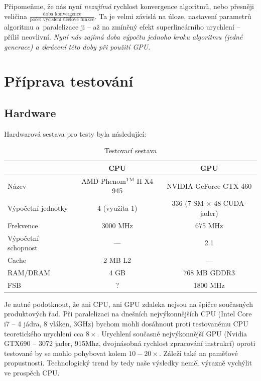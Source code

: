 
Připomeňme, že nás nyní \emph{nezajímá} rychlost konvergence algoritmů, nebo přesněji veličina $\frac{\text{doba konvergence}}{\text{počet vyčíslení účelové funkce}}$. Ta je velmi závislá na úloze, nastavení parametrů algoritmu a~paralelizace ji -- až na zmíněný efekt superlineárního urychlení -- příliš neovlivní. \emph{Nyní nás zajímá doba výpočtu jednoho kroku algoritmu (jedné generace) a zkrácení této doby při použití GPU}.

\section{Příprava testování}
\subsection{Hardware}

Hardwarová sestava pro testy byla následující:

\begin{table}[h]
    \begin{center}
    \begin{tabular}{lcc}
      \toprule
      & CPU & GPU \\
      \midrule
      Název & AMD Phenom$^\mathrm{TM}$ II X4 945 & NVIDIA GeForce GTX 460 \\
      Výpočetní jednotky & 4 (využita 1) & 336 (7 SM $\times$ 48 CUDA-jader) \\
      Frekvence & 3000 MHz & 675 MHz \\
      Výpočetní schopnost & --- & 2.1 \\
      Cache & 2 MB L2 & --- \\
      RAM/DRAM & 4 GB & 768 MB GDDR3 \\
      FSB & ? & 1800 MHz \\
      \bottomrule
    \end{tabular}
    \caption{Testovací sestava}
    \end{center}
\end{table}

Je nutné podotknout, že ani CPU, ani GPU zdaleka nejsou na špičce současných produktových řad. Při paralelizaci na dnešních nejvýkonnějších CPU (Intel Core i7 -- 4 jádra, 8 vláken, 3GHz) bychom mohli dosáhnout proti testovanému CPU teoretického urychlení cca $8\times$. Urychlení současné nejvýkonnější GPU (Nvidia GTX690 -- 3072 jader, 915Mhz, dvojnásobná rychlost zpracování instrukcí) oproti testované by se mohlo pohybovat kolem $10-20\times$. Záleží také na paměťové propustnosti. Technologický trend by tedy naše výsledky neměl výrazně vychýlit ve prospěch CPU.

